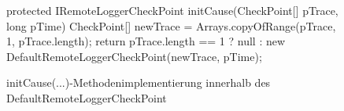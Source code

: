 \begin{figure}[h]
	\begin{spacing}{0.75}
		\begin{javacode}[firstnumber=125]
protected IRemoteLoggerCheckPoint initCause(CheckPoint[] pTrace, long pTime)
{
  CheckPoint[] newTrace = Arrays.copyOfRange(pTrace, 1, pTrace.length);
  return pTrace.length == 1 ? null : new DefaultRemoteLoggerCheckPoint(newTrace, pTime);
}		\end{javacode}
	\end{spacing}
	\caption{initCause(...)-Methodenimplementierung innerhalb des \glqq DefaultRemoteLoggerCheckPoint\grqq}
\end{figure}